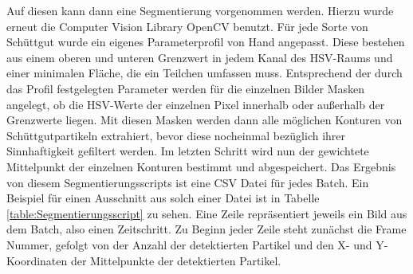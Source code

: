 Auf diesen kann dann eine Segmentierung vorgenommen werden.
Hierzu wurde erneut die Computer Vision Library OpenCV benutzt.
Für jede Sorte von Schüttgut wurde ein eigenes Parameterprofil von Hand angepasst.
Diese bestehen aus einem oberen und unteren Grenzwert in jedem Kanal des HSV-Raums und einer minimalen Fläche, die ein Teilchen umfassen muss.
Entsprechend der durch das Profil festgelegten Parameter werden für die einzelnen Bilder Masken angelegt,
ob die HSV-Werte der einzelnen Pixel innerhalb oder außerhalb der Grenzwerte liegen. 
Mit diesen Masken werden dann alle möglichen Konturen von Schüttgutpartikeln extrahiert, 
bevor diese nocheinmal bezüglich ihrer Sinnhaftigkeit gefiltert werden. 
Im letzten Schritt wird nun der gewichtete Mittelpunkt der einzelnen Konturen bestimmt und abgespeichert.
Das Ergebnis von diesem Segmentierungsscripts ist eine CSV Datei für jedes Batch.
Ein Beispiel für einen Ausschnitt aus solch einer Datei ist in Tabelle \ref{table:Segmentierungsscript} zu sehen.
Eine Zeile repräsentiert jeweils ein Bild aus dem Batch, also einen Zeitschritt.
Zu Beginn jeder Zeile steht zunächst die Frame Nummer, gefolgt von der Anzahl der detektierten Partikel
und den X- und Y-Koordinaten der Mittelpunkte der detektierten Partikel.


